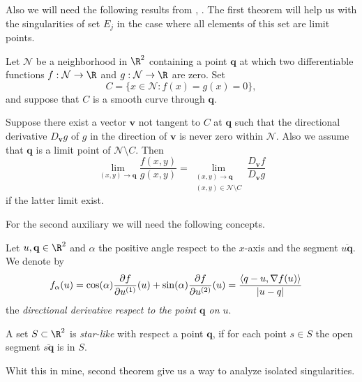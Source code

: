 	Also we will need the following results from \cite[Thm 2.1]{Lawlor2012}, \cite[Thm. 1]{FineAIandKass1966}.
The first theorem will help us  with the singularities of set $E_j$ in the case where all elements of this set
are limit points. 
\begin{thm} \label{thm:Lawlor}
	Let $\mathcal{N}$ be a neighborhood in $\R^2$ containing a point $\mathbf{q}$ at which
	two differentiable functions $f:\mathcal{N}\to \R$ and $g:\mathcal{N}\to \R$ are zero.
	Set 
	$$
		C=\{x \in \mathcal{N}: f(x)=g(x)=0 \},
	$$
	and suppose that $C$ is a smooth curve through $\mathbf{q}$.
	
	Suppose	there exist a vector $\mathbf{v}$ not tangent to $C$ at $\mathbf{q}$
	such that the directional derivative $D_{\mathbf{v}}g$ of $g$ in the direction of $\mathbf{v}$ is never zero
	within $\mathcal{N}$. Also we assume that $\mathbf{q}$ is a limit point of $\mathcal{N}\setminus C$. Then
	\begin{equation*}
		\lim_{(x,y)\to \mathbf{q}}
		\frac{f(x,y)}{g(x,y)} =
		\lim_{
				\substack{
					(x,y)\to \mathbf{q}\\ 
					(x,y)\in \mathcal{N} \setminus C
				}
		}
		\frac{D_{\mathbf{v}} f }{D_{\mathbf{v}} g}
	\end{equation*}
	if the latter limit exist.
\end{thm}
For the second auxiliary we will need the following concepts.
\begin{dfn}
	Let $u,\mathbf{q}\in \R^2$ and $\alpha$ the positive angle respect to the $x$-axis and the segment
	$\overline{u \mathbf{q}}$.	We denote by 
	\begin{align*}
		f_{\alpha}(u) &= 
			\cos(\alpha) 		
			\frac{\partial f}{\partial u^{(1)}}(u) + 
			\sin(\alpha)
			\frac{\partial f}{\partial u^{(2)}}(u) 
			= \frac{ \left\langle q-u, \nabla f(u)\right\rangle}{|u-q|}			
	\end{align*}
	the \emph{directional derivative respect to the point $\mathbf{q}$ on $u$}.
\end{dfn}
\begin{dfn}
	A set $S\subset \R^2$ is \emph{star-like} with respect a point $\mathbf{q}$, if for each point $s \in S$ the open 
	segment $\overline{s \mathbf{q}}$ is in $S$.
\end{dfn}
%
Whit this in mine, second theorem give us a way to analyze isolated singularities.
